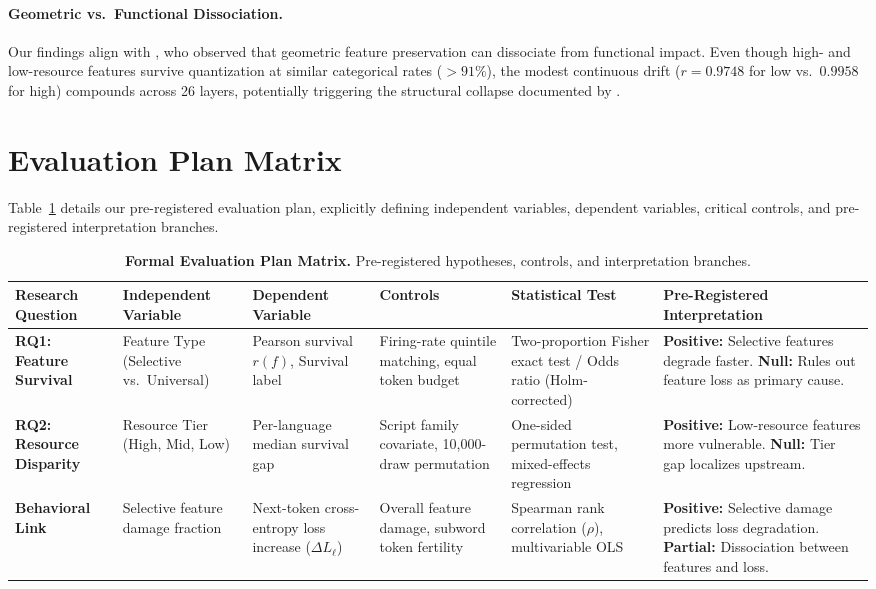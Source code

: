 \documentclass[11pt]{article}
\begin{document}
\paragraph{Geometric vs.\ Functional Dissociation.}
Our findings align with \citet{borobia2026how}, who observed that geometric feature preservation can dissociate from functional impact. Even though high- and low-resource features survive quantization at similar categorical rates ($>91\%$), the modest continuous drift ($r = 0.9748$ for low vs.\ $0.9958$ for high) compounds across 26 layers, potentially triggering the structural collapse documented by \citet{soualhi2026multilingual}.

\section{Evaluation Plan Matrix}
Table~\ref{tab:eval_plan} details our pre-registered evaluation plan, explicitly defining independent variables, dependent variables, critical controls, and pre-registered interpretation branches.

\begin{table}[!tp]
\centering
\footnotesize
\begin{tabularx}{\textwidth}{lXXXXX}
\toprule
\textbf{Research Question} & \textbf{Independent Variable} & \textbf{Dependent Variable} & \textbf{Controls} & \textbf{Statistical Test} & \textbf{Pre-Registered Interpretation} \\
\midrule
\textbf{RQ1: Feature Survival} & Feature Type (Selective vs.\ Universal) & Pearson survival $r(f)$, Survival label & Firing-rate quintile matching, equal token budget & Two-proportion Fisher exact test / Odds ratio (Holm-corrected) & \textbf{Positive:} Selective features degrade faster. \newline \textbf{Null:} Rules out feature loss as primary cause. \\
\midrule
\textbf{RQ2: Resource Disparity} & Resource Tier (High, Mid, Low) & Per-language median survival gap & Script family covariate, 10,000-draw permutation & One-sided permutation test, mixed-effects regression & \textbf{Positive:} Low-resource features more vulnerable. \newline \textbf{Null:} Tier gap localizes upstream. \\
\midrule
\textbf{Behavioral Link} & Selective feature damage fraction & Next-token cross-entropy loss increase ($\Delta L_\ell$) & Overall feature damage, subword token fertility & Spearman rank correlation ($\rho$), multivariable OLS & \textbf{Positive:} Selective damage predicts loss degradation. \newline \textbf{Partial:} Dissociation between features and loss. \\
\bottomrule
\end{tabularx}
\caption{\textbf{Formal Evaluation Plan Matrix.} Pre-registered hypotheses, controls, and interpretation branches.}
\label{tab:eval_plan}
\end{table}
\end{document}
